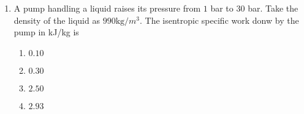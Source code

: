 \documentclass[journal,12pt,onecolumn]{IEEEtran}
\theoremstyle{remark}
\begin{document}
\begin{enumerate}
\item A pump handling a liquid raises its pressure from $1$ bar to $30$ bar. Take the density of the liquid as $990 \text{kg}/{m}^3$. The isentropic specific work donw by the pump in kJ/kg is
\hfill{}
\begin{enumerate}
\item $0.10$
\item $0.30$
\item $2.50$
\item $2.93$
\end{enumerate}



\end{enumerate}
\end{document}
